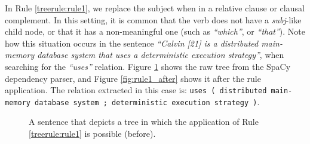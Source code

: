 \documentclass[11pt,a4paper,openright]{memoir}
\begin{document}
In Rule \ref{treerule:rule1}, we replace the subject when in a relative clause or clausal complement. In this setting, it is common that the verb does not have a \emph{subj}-like child node, or that it has a non-meaningful one (such as \emph{\enquote{which}}, or \emph{\enquote{that}}). Note how this situation occurs in the sentence \emph{\enquote{Calvin [21] is a distributed main-memory database system that uses a deterministic execution strategy}}, when searching for the \emph{\enquote{uses}} relation. Figure \ref{fig:rule1_before} shows the raw tree from the SpaCy dependency parser, and Figure \ref{fig:rule1_after} shows it after the rule application. The relation extracted in this case is: \texttt{uses	( distributed main-memory database system ; deterministic execution strategy )}.

\begin{figure}[!htbp]
\centering


\caption[A sentence that depicts a tree in which the application of Rule \ref{treerule:rule1} is possible (before).]{A sentence that depicts a tree in which the application of Rule \ref{treerule:rule1} is possible (before).}
\label{fig:rule1_before}
\end{figure}
\end{document}
